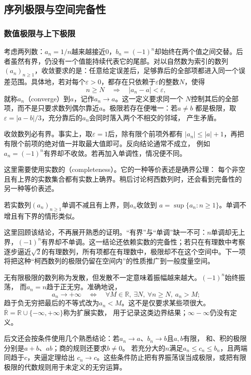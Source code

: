 \subsection{序列极限与空间完备性}
\subsubsection{数值极限与上下极限}

考虑两列数：$a_n=1/n$越来越接近$0$，$b_n=(-1)^n$却始终在两个值之间交替。后者虽然有界，仍没有一个值能持续代表它的尾部。对以自然数为索引的数列$(a_n)_{n\geq1}$，收敛要求的是：任意给定误差后，足够靠后的全部项都进入同一个误差范围。具体地，若对每个$\varepsilon>0$，都存在只依赖于$\varepsilon$的整数$N$，使得
\[   n\geq N\quad\Longrightarrow\quad |a_n-a|<\varepsilon, \]
就称$a_n$（converge）到$a$，记作$a_n\to a$。这一定义要求同一个 $N$控制其后的全部项，而不是只要求数列偶尔靠近$a$。极限若存在便唯一：若$a\neq b$ 都是极限，取$\varepsilon=|a-b|/3$，充分靠后的$a_n$会同时落入两个不相交的邻域， 产生矛盾。

收敛数列必有界。事实上，取$\varepsilon=1$后，除有限个前项外都有 $|a_n|\leq |a|+1$，再把有限个前项的绝对值一并取最大值即可。反向结论通常不成立， 例如$a_n=(-1)^n$有界却不收敛。若再加入单调性，情况便不同。

这里需要使用实数的（completeness）。它的一种等价表述是确界公理：
每个非空且有上界的实数集合都有实数上确界。稍后讨论柯西数列时，还会看到完备性的
另一种等价表述。
\begin{theorem}[单调有界收敛定理]
\label{thm:analysis-monotone-bounded-sequence}
若实数列$(a_n)_{n\geq1}$单调不减且有上界，则$a_n$收敛到 $a=\sup\{a_n:n\geq1\}$。单调不增且有下界的情形类似。
\end{theorem}
这里回顾该结论，不再展开熟悉的证明。“有界”与“单调”缺一不可：$n$单调却无上界，$(-1)^n$有界却不单调。这一结论还依赖实数的完备性；若只在有理数中考察逐步逼近$\sqrt{2}$的有理数列，所有项都在有理数中，极限却不在这个空间中。下一项将把这种“柯西数列的极限仍留在空间内”的性质推广到一般度量空间。

无有限极限的数列称为发散，但发散不一定意味着振幅越来越大。$(-1)^n$始终振荡，
而$a_n=n$趋于正无穷。准确地说，
\[
 a_n\to+\infty
 \quad\Longleftrightarrow\quad
 \forall M\in\mathbb R,\ \exists N,\ \forall n\geq N,\ a_n>M;
\]
趋于负无穷把最后的不等式改为$a_n<M$。这不是仅要求某些项很大。
$\overline{\mathbb R}=\mathbb R\cup\{-\infty,+\infty\}$称为扩展实数，
用于记录这类边界结果；$\infty-\infty$仍没有定义。

后文还会按条件使用几个熟悉结论：若$a_n\to a$、$b_n\to b$且$a,b$有限，
和、积的极限分别是$a+b$、$ab$；商的规则还要求$b\neq0$。
若充分大的$n$满足$a_n\leq c_n\leq b_n$，且两端同趋于$c$，夹逼定理给出
$c_n\to c$。这些条件防止把有界振荡误当成极限，或把有限极限的代数规则用于未定义的无穷运算。

